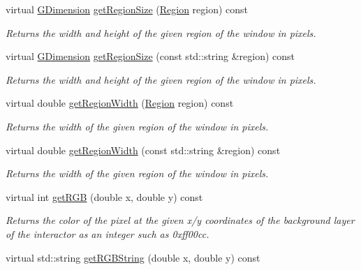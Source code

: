 \begin{DoxyCompactItemize}
virtual \mbox{\hyperlink{structsgl_1_1GDimension}{G\+Dimension}} \mbox{\hyperlink{classsgl_1_1GWindow_a3b5db9ffbd4b32260f80634f162dba4e}{get\+Region\+Size}} (\mbox{\hyperlink{classsgl_1_1GWindow_a81a01a86de31071a92e6cce0bab9bc4b}{Region}} region) const
\begin{DoxyCompactList}\small\item\em Returns the width and height of the given region of the window in pixels. \end{DoxyCompactList}\item 
virtual \mbox{\hyperlink{structsgl_1_1GDimension}{G\+Dimension}} \mbox{\hyperlink{classsgl_1_1GWindow_a68b18b38b72cb8779fca0c3882549a6b}{get\+Region\+Size}} (const std\+::string \&region) const
\begin{DoxyCompactList}\small\item\em Returns the width and height of the given region of the window in pixels. \end{DoxyCompactList}\item 
virtual double \mbox{\hyperlink{classsgl_1_1GWindow_a96e2005c3f447a8679c3c32d3fc02de1}{get\+Region\+Width}} (\mbox{\hyperlink{classsgl_1_1GWindow_a81a01a86de31071a92e6cce0bab9bc4b}{Region}} region) const
\begin{DoxyCompactList}\small\item\em Returns the width of the given region of the window in pixels. \end{DoxyCompactList}\item 
virtual double \mbox{\hyperlink{classsgl_1_1GWindow_ab169dab454fc90f1c845b91b4e1a8a14}{get\+Region\+Width}} (const std\+::string \&region) const
\begin{DoxyCompactList}\small\item\em Returns the width of the given region of the window in pixels. \end{DoxyCompactList}\item 
virtual int \mbox{\hyperlink{classsgl_1_1GDrawingSurface_a9e983467cf0c97cfd62433a8471570dc}{get\+R\+GB}} (double x, double y) const
\begin{DoxyCompactList}\small\item\em Returns the color of the pixel at the given x/y coordinates of the background layer of the interactor as an integer such as 0xff00cc. \end{DoxyCompactList}\item 
virtual std\+::string \mbox{\hyperlink{classsgl_1_1GDrawingSurface_a456d3582acc3544f37d939f5cb8802fe}{get\+R\+G\+B\+String}} (double x, double y) const

\end{DoxyCompactItemize}
